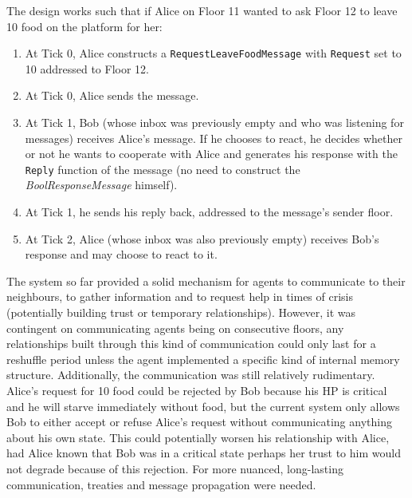 \documentclass{article}
\begin{document}
The design works such that if Alice on Floor 11 wanted to ask Floor 12 to leave 10 food on the platform for her:
\begin{enumerate}
    \item At Tick 0, Alice constructs a \texttt{RequestLeaveFoodMessage} with \texttt{Request} set to 10 addressed to Floor 12.
    \item At Tick 0, Alice sends the message.
    \item At Tick 1, Bob (whose inbox was previously empty and who was listening for messages) receives Alice's message. If he chooses to react, he decides whether or not he wants to cooperate with Alice and generates his response with the \texttt{Reply} function of the message (no need to construct the \textit{BoolResponseMessage} himself).
    \item At Tick 1, he sends his reply back, addressed to the message's sender floor.
    \item At Tick 2, Alice (whose inbox was also previously empty) receives Bob's response and may choose to react to it.
\end{enumerate}
The system so far provided a solid mechanism for agents to communicate to their neighbours, to gather information and to request help in times of crisis (potentially building trust or temporary relationships). However, it was contingent on communicating agents being on consecutive floors, any relationships built through this kind of communication could only last for a reshuffle period unless the agent implemented a specific kind of internal memory structure. Additionally, the communication was still relatively rudimentary. Alice's request for 10 food could be rejected by Bob because his HP is critical and he will starve immediately without food, but the current system only allows Bob to either accept or refuse Alice's request without communicating anything about his own state. This could potentially worsen his relationship with Alice, had Alice known that Bob was in a critical state perhaps her trust to him would not degrade because of this rejection. \newline 
For more nuanced, long-lasting communication, treaties and message propagation were needed.
\end{document}
